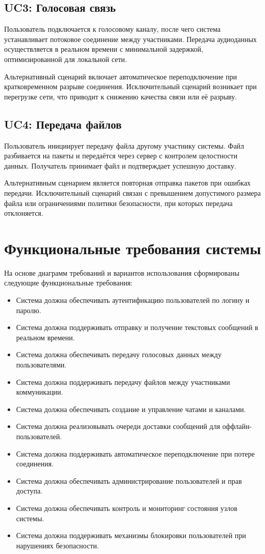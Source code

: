 \documentclass[14pt,a4paper]{extarticle}
\begin{document}
\subsection{UC3: Голосовая связь}
Пользователь подключается к голосовому каналу, после чего система устанавливает потоковое соединение между участниками. Передача аудиоданных осуществляется в реальном времени с минимальной задержкой, оптимизированной для локальной сети.

Альтернативный сценарий включает автоматическое переподключение при кратковременном разрыве соединения. Исключительный сценарий возникает при перегрузке сети, что приводит к снижению качества связи или её разрыву.

\subsection{UC4: Передача файлов}
Пользователь инициирует передачу файла другому участнику системы. Файл разбивается на пакеты и передаётся через сервер с контролем целостности данных. Получатель принимает файл и подтверждает успешную доставку.

Альтернативным сценарием является повторная отправка пакетов при ошибках передачи. Исключительный сценарий связан с превышением допустимого размера файла или ограничениями политики безопасности, при которых передача отклоняется.

\section{Функциональные требования системы}

На основе диаграмм требований и вариантов использования сформированы следующие функциональные требования:

\begin{itemize}
    \item Система должна обеспечивать аутентификацию пользователей по логину и паролю.
    \item Система должна поддерживать отправку и получение текстовых сообщений в реальном времени.
    \item Система должна обеспечивать передачу голосовых данных между пользователями.
    \item Система должна поддерживать передачу файлов между участниками коммуникации.
    \item Система должна обеспечивать создание и управление чатами и каналами.
    \item Система должна реализовывать очереди доставки сообщений для оффлайн-пользователей.
    \item Система должна поддерживать автоматическое переподключение при потере соединения.
    \item Система должна обеспечивать администрирование пользователей и прав доступа.
    \item Система должна обеспечивать контроль и мониторинг состояния узлов системы.
    \item Система должна поддерживать механизмы блокировки пользователей при нарушениях безопасности.
\end{itemize}
\end{document}
